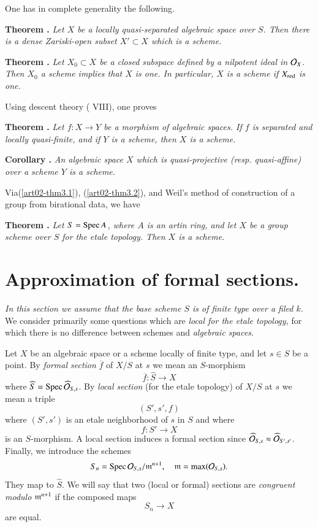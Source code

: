 One has in complete generality the following.

\medskip
\noindent
{\bf Theorem .\label{art02-thm3.1}}
{\em Let $X$ be a locally quasi-separated algebraic space over $S$. Then there is a dense Zariski-open subset $X'\subset X$ which is a scheme.}

\medskip
\noindent
{\bf Theorem .\label{art02-thm3.2}}
{\em Let $X_{0}\subset X$ be a closed subspace defined by a nilpotent ideal in $\mathcal{O}_{X}$. Then $X_{0}$ a scheme implies that $X$ is one. In particular, $X$ is a scheme if $X_{\operatorname{\mathrm{red}}}$ is one.}
\medskip

Using descent theory (\cite{art02-key14} VIII), one proves

\medskip
\noindent
{\bf Theorem .\label{art02-thm3.3}}
{\em Let $f:X\to Y$ be a morphism of algebraic spaces. If $f$ is separated and locally quasi-finite, and if $Y$ is a scheme, then $X$ is a scheme.}

\medskip
\noindent
{\bf Corollary .\label{art02-coro3.4}}
{\em An algebraic space $X$ which is quasi-projective (resp. quasi-affine) over a scheme $Y$ is a scheme.}
\medskip

Via\pageoriginale (\ref{art02-thm3.1}), (\ref{art02-thm3.2}), and Weil's method \cite{art02-key34} of construction of a group from birational data, we have

\medskip
\noindent
{\bf Theorem .\label{art02-thm3.5}}
{\em Let $S=\operatorname{Spec} A$, where $A$ is an artin ring, and let $X$ be a group scheme over $S$ for the etale topology. Then $X$ is a scheme.}

\section{Approximation of formal sections.}\label{art02-sec4}

{\em In this section we assume that the base scheme $S$ is of finite type over a filed $k$.} We consider primarily some questions which are {\em local for the etale topology,} for which there is no difference between schemes and {\em algebraic spaces}.

Let $X$ be an algebraic space or a scheme locally of finite type, and let $s\in S$ be a point. By {\em formal section} $\overline{f}$ of $X/S$ at $s$ we mean an $S$-morphism
$$
\overline{f}:\widehat{S}\to X
$$
where $\widehat{S}=\operatorname{Spec} \widehat{\mathcal{O}}_{S,s}$. By {\em local section} (for the etale topology) of $X/S$ at $s$ we mean a triple
$$
(S',s',f)
$$
where $(S',s')$ is an etale neighborhood of $s$ in $S$ and where
$$
f:S'\to X
$$
is an $S$-morphism. A local section induces a formal section since $\widehat{\mathcal{O}}_{S,s}\approx \widehat{\mathcal{O}}_{S',s'}$. Finally, we introduce the schemes
$$
S_{n}=\operatorname{Spec} \mathcal{O}_{S,s}/\mathfrak{m}^{n+1},\quad\mathfrak{m}=\max(\mathcal{O}_{S,s}).
$$
They map to $\widehat{S}$. We will say that two (local or formal) sections are {\em congruent modulo} $\mathfrak{m}^{n+1}$ if the composed maps
$$
S_{n}\to X
$$
are equal.

